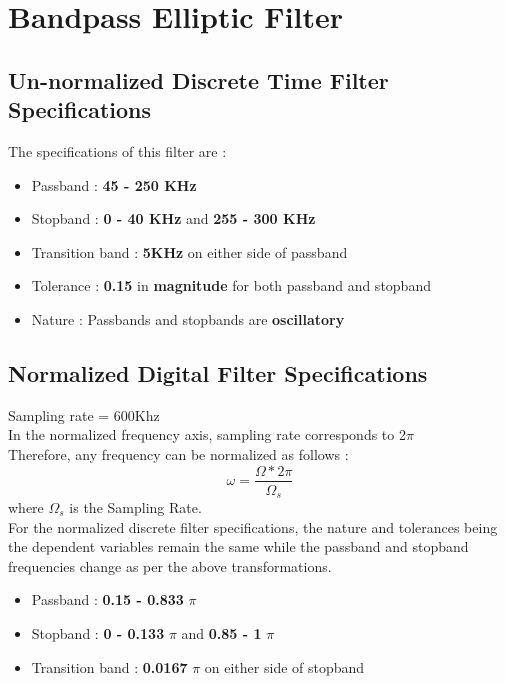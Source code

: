 \documentclass{article}
\begin{document}
\section{\textbf{Bandpass Elliptic Filter}}
\subsection{\textbf{Un-normalized Discrete Time Filter Specifications}}

\vspace{1.5em}
\noindent
The specifications of this filter are :

\begin{itemize}
    \item Passband : \textbf{45 - 250 KHz}
    \item Stopband : \textbf{0 - 40 KHz} and \textbf{255 - 300 KHz}
    \item  Transition band : \textbf{5KHz} on either side of passband
    \item  Tolerance : \textbf{0.15} in \textbf{magnitude} for both passband and stopband
    \item  Nature : Passbands and stopbands are \textbf{oscillatory} 
\end{itemize}

\subsection{Normalized Digital Filter Specifications}
Sampling rate = 600Khz\\
In the normalized frequency axis, sampling rate corresponds to 2$\pi$\\
Therefore, any frequency can be normalized as follows :
\begin{equation*}
    \omega = \frac{\Omega*2\pi}{\Omega_s}
\end{equation*}
where $\Omega_s$ is the Sampling Rate.\\

\vspace{1em}
\noindent
For the normalized discrete filter specifications, the nature and tolerances being the dependent variables remain the same while the passband and stopband frequencies change as per the above transformations. 
\begin{itemize}
    \item Passband : \textbf{0.15 - 0.833} {$\pi$}
    \item Stopband : \textbf{0 -  0.133} {$\pi$} and \textbf{0.85 - 1} {$\pi$}
    \item  Transition band : \textbf{0.0167} $\pi$ on either side of stopband
\end{itemize}
\end{document}
